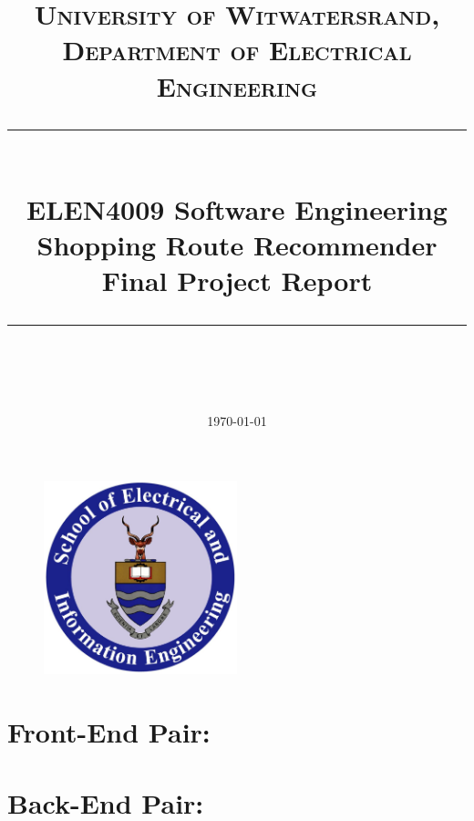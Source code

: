 \documentclass[10pt, a4paper, twocolumn]{scrartcl}
\begin{document}
 

\onecolumn
\thispagestyle{empty}

\newcommand{\horrule}[1]{\rule{\linewidth}{#1}}

	\title{\normalfont \normalsize
		\textsc{University of Witwatersrand, Department of Electrical Engineering} \\ [10pt]
		\horrule{0.5pt} \\ [10pt]
		\huge ELEN4009 Software Engineering \\ Shopping Route Recommender Final Project Report \\
		\horrule{2pt} \\ }
	\date {\normalsize \today}
	
	\maketitle

	\begin{figure}[h!]
		\centering
		\includegraphics[width = 0.5\textwidth]{Images/witsLogo.jpg}
	\end{figure}


\section*{Front-End Pair:} 

\section*{Back-End Pair:} 
\end{document}
